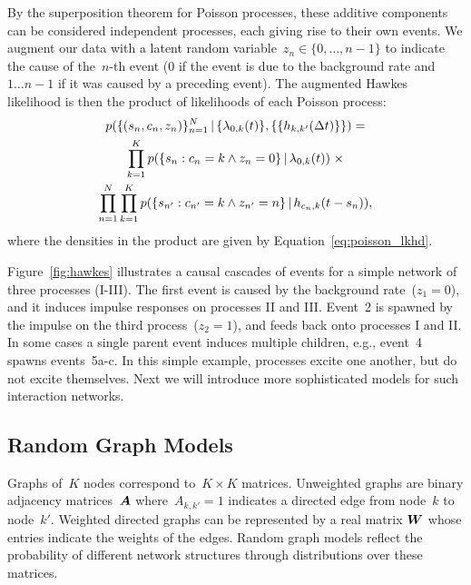 By the superposition theorem for Poisson processes, these additive components can be considered independent processes, each giving rise to their own events. 
We augment our data with a latent random variable~${z_n\in\{0,\ldots,n-1\}}$ to indicate the cause of the~$n$-th event ($0$ if the event is due to the background rate and ${1\ldots n-1}$ if it was caused by a preceding event). The augmented Hawkes likelihood is then the product of likelihoods of each Poisson process:
\begin{multline*}
p(\{(s_n,c_n,z_n)\}^N_{n=1} \,|\, \{\lambda_{0,k}(t)\}, \{\{h_{k,k'}(\Delta t)\}\}) = \\
\prod^K_{k=1} p(\{s_{n}: c_{n}=k \wedge z_{n}=0\}\,|\, \lambda_{0,k}(t))\;\times\\
\prod_{n=1}^N\prod_{k=1}^K p(\{s_{n'}: c_{n'}=k \wedge z_{n'}=n\}\,|\, h_{c_n,k}(t-s_n)),
\end{multline*}
where the densities in the product are given by Equation~\ref{eq:poisson_lkhd}.

Figure~\ref{fig:hawkes} illustrates a causal cascades of events for a simple network of three processes (I-III).  The first event is caused by the background rate~(${z_1=0}$), and it induces impulse responses on processes II and III. Event~2 is spawned by the impulse on the third process~(${z_2=1}$), and feeds back onto processes I and II. In some cases a single parent event induces multiple children, e.g., event~4 spawns events~{5a-c}. In this simple example, processes excite one another, but do not excite themselves. Next we will introduce more sophisticated models for such interaction networks.  

\subsection{Random Graph Models}
\label{sec:graph_models}
Graphs of~$K$ nodes correspond to~${K\times K}$ matrices. Unweighted graphs are binary adjacency matrices~$\boldsymbol{A}$ where~${A_{k,k'}=1}$ indicates a directed edge from node~$k$ to node~$k'$. Weighted directed graphs can be represented by a real matrix $\boldsymbol{W}$ whose entries indicate the weights of the edges. Random graph models reflect the probability of different network structures through distributions over these matrices.

